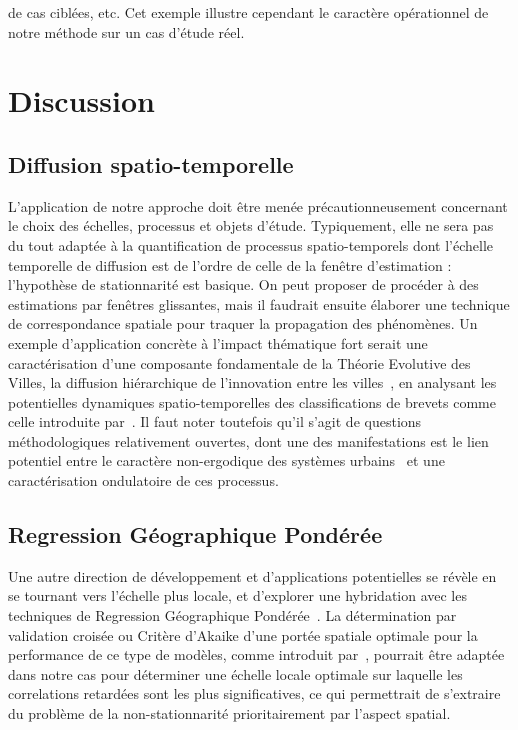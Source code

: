 \documentclass[french]{./sageo}
\begin{document}
de cas ciblées, etc. Cet exemple illustre cependant le caractère opérationnel de notre méthode sur un cas d'étude réel.
 




\section{Discussion}


\subsection{Diffusion spatio-temporelle}


L'application de notre approche doit être menée précautionneusement concernant le choix des échelles, processus et objets d'étude. Typiquement, elle ne sera pas du tout adaptée à la quantification de processus spatio-temporels dont l'échelle temporelle de diffusion est de l'ordre de celle de la fenêtre d'estimation : l'hypothèse de stationnarité est basique. On peut proposer de procéder à des estimations par fenêtres glissantes, mais il faudrait ensuite élaborer une technique de correspondance spatiale pour traquer la propagation des phénomènes. Un exemple d'application concrète à l'impact thématique fort serait une caractérisation d'une composante fondamentale de la Théorie Evolutive des Villes, la diffusion hiérarchique de l'innovation entre les villes~\cite{pumain2010theorie}, en analysant les potentielles dynamiques spatio-temporelles des classifications de brevets comme celle introduite par~\cite{10.1371/journal.pone.0176310}. Il faut noter toutefois qu'il s'agit de questions méthodologiques relativement ouvertes, dont une des manifestations est le lien potentiel entre le caractère non-ergodique des systèmes urbains~\cite{pumain2012urban} et une caractérisation ondulatoire de ces processus.




\subsection{Regression Géographique Pondérée}


Une autre direction de développement et d'applications potentielles se révèle en se tournant vers l'échelle plus locale, et d'explorer une hybridation avec les techniques de Regression Géographique Pondérée~\cite{brunsdon1998geographically}. La détermination par validation croisée ou Critère d'Akaike d'une portée spatiale optimale pour la performance de ce type de modèles, comme introduit par~\cite{2017arXiv170607467R}, pourrait être adaptée dans notre cas pour déterminer une échelle locale optimale sur laquelle les correlations retardées sont les plus significatives, ce qui permettrait de s'extraire du problème de la non-stationnarité prioritairement par l'aspect spatial.
\end{document}

